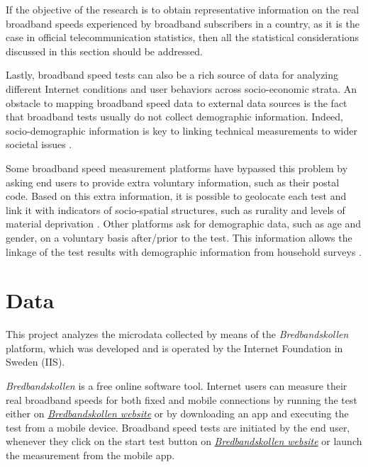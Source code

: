 \documentclass[12pt]{article}
\begin{document}
If the objective of the research is to obtain representative information on the real broadband speeds experienced by broadband subscribers in a country, as it is the case in official telecommunication statistics, then all the statistical considerations discussed in this section should be addressed.

Lastly, broadband speed tests can also be a rich source of data for analyzing different Internet conditions and user behaviors across socio-economic strata. An obstacle to mapping broadband speed data to external data sources is the fact that broadband tests usually do not collect demographic information. Indeed, socio-demographic information is key to linking technical measurements to wider societal issues \citep[for an example, see Chapter 6 in][]{misr2016}. 

Some broadband speed measurement platforms have bypassed this problem by asking end users to provide extra voluntary information, such as their postal code. Based on this extra information, it is possible to geolocate each test and link it with indicators of socio-spatial structures, such as rurality and levels of material deprivation \citep{riddlesden2014}. Other platforms ask for demographic data, such as age and gender, on a voluntary basis after/prior to the test. This information allows the linkage of the test results with demographic information from household surveys \citep{opt2012}. 
   

\section{Data}

This project analyzes the microdata collected by means of the \textit{Bredbandskollen} platform, which was developed and is operated by the Internet Foundation in Sweden (IIS).

\textit{Bredbandskollen} is a free online software tool. Internet users can measure their real broadband speeds for both fixed and mobile connections by running the test either on \href{https://www.bredbandskollen.se/}{\textit{Bredbandskollen website}} or by downloading an app and executing the test from a mobile device. Broadband speed tests are initiated by the end user, whenever they click on the start test button on \href{https://www.bredbandskollen.se/}{\textit{Bredbandskollen website}} or launch the measurement from the mobile app.   
\end{document}
